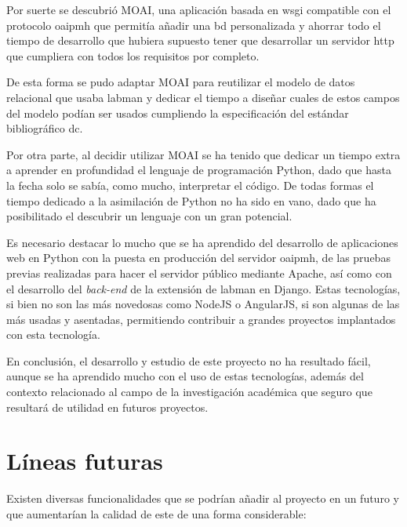 Por suerte se descubrió MOAI, una aplicación basada en \acrshort{wsgi} compatible con el protocolo \acrshort{oaipmh} que permitía añadir una \acrshort{bd} personalizada y ahorrar todo el tiempo de desarrollo que hubiera supuesto tener que desarrollar un servidor \acrshort{http} que cumpliera con todos los requisitos por completo.

De esta forma se pudo adaptar MOAI para reutilizar el modelo de datos relacional que usaba \acrshort{labman} y dedicar el tiempo a diseñar cuales de estos campos del modelo podían ser usados cumpliendo la especificación del estándar bibliográfico \acrshort{dc}.

Por otra parte, al decidir utilizar MOAI se ha tenido que dedicar un tiempo extra a aprender en profundidad el lenguaje de programación Python, dado que hasta la fecha solo se sabía, como mucho, interpretar el código. De todas formas el tiempo dedicado a la asimilación de Python no ha sido en vano, dado que ha posibilitado el descubrir un lenguaje con un gran potencial.

Es necesario destacar lo mucho que se ha aprendido del desarrollo de aplicaciones web en Python con la puesta en producción del servidor \acrshort{oaipmh}, de las pruebas previas realizadas para hacer el servidor público mediante Apache, así como con el desarrollo del \textit{back-end} de la extensión de \acrshort{labman} en Django. Estas tecnologías, si bien no son las más novedosas como NodeJS\cite{NodeJS} o AngularJS\cite{AngularJS}, si son algunas de las más usadas y asentadas, permitiendo contribuir a grandes proyectos implantados con esta tecnología.

En conclusión, el desarrollo y estudio de este proyecto no ha resultado fácil, aunque se ha aprendido mucho con el uso de estas tecnologías, además del contexto relacionado al campo de la investigación académica que seguro que resultará de utilidad en futuros proyectos.

\section{Líneas futuras}\label{sec:future_lines}

Existen diversas funcionalidades que se podrían añadir al proyecto en un futuro y que aumentarían la calidad de este de una forma considerable:

